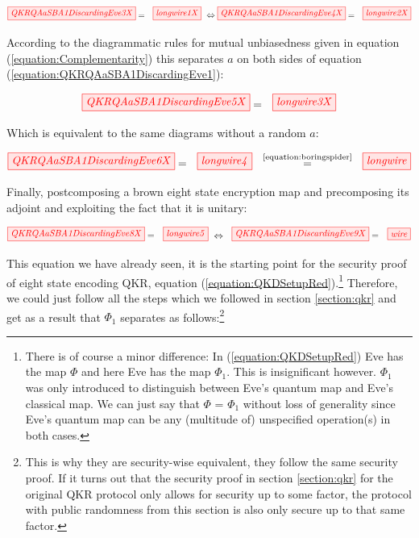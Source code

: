\documentclass[]{article}
\newcommand{\equaltext}[1]{\ensuremath{\stackrel{\text{#1}}{=}}}
\begin{document}
\begin{equation}\\
\label{equation:QKRQAaSBA1DiscardingEve3}
\tikzfig{QKRQAaSBA1DiscardingEve3X} = ~~ \tikzfig{longwire1X} ~
\Leftrightarrow
\tikzfig{QKRQAaSBA1DiscardingEve4X} = ~~ \tikzfig{longwire2X}
\end{equation}

According to the diagrammatic rules for mutual unbiasedness given in equation (\ref{equation:Complementarity}) this separates $a$ on both sides of equation (\ref{equation:QKRQAaSBA1DiscardingEve1}):

\begin{equation}
\label{QKRQAaSBA1DiscardingEve5}
\tikzfig{QKRQAaSBA1DiscardingEve5X} = ~~ \tikzfig{longwire3X}
\end{equation}

Which is equivalent to the same diagrams without a random $a$:

\begin{equation}
\tikzfig{QKRQAaSBA1DiscardingEve6X} = ~~ \tikzfig{longwire4} ~~ \equaltext{\ref{equation:boringspider}} ~~ \tikzfig{longwire}
\end{equation}

Finally, postcomposing a brown eight state encryption map and precomposing its adjoint and exploiting the fact that it is unitary:

\begin{equation}
\tikzfig{QKRQAaSBA1DiscardingEve8X} = ~~ \tikzfig{longwire5} ~ \Leftrightarrow ~~ \tikzfig{QKRQAaSBA1DiscardingEve9X} = ~~ \tikzfig{wire}
\end{equation}


This equation we have already seen, it is the starting point for the security proof of eight state encoding QKR, equation (\ref{equation:QKDSetupRed}).\footnote{There is of course a minor difference: In (\ref{equation:QKDSetupRed}) Eve has the map $\Phi$ and here Eve has the map $\Phi_1$. This is insignificant however. $\Phi_1$ was only introduced to distinguish between Eve's quantum map and Eve's classical map. We can just say that $\Phi$ = $\Phi_1$ without loss of generality since Eve's quantum map can be any (multitude of) unspecified operation(s) in both cases.} Therefore, we could just follow all the steps which we followed in section \ref{section:qkr} and get as a result that $\Phi_1$ separates as follows:\footnote{This is why they are security-wise equivalent, they follow the same security proof. If it turns out that the security proof in section \ref{section:qkr} for the original QKR protocol only allows for security up to some factor, the protocol with public randomness from this section is also only secure up to that same factor.}
\end{document}
